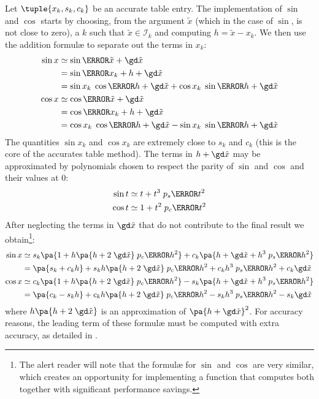\documentclass[10pt, a4paper, twoside]{basestyle}
\newcommand{\red}[1]{\tilde{#1}}
\begin{document}
Let $\tuple{x_k, s_k, c_k}$ be an accurate table entry.  The implementation of $\sin$ and $\cos$ starts by choosing, from the argument $\red x$ (which in the case of $\sin$, is not close to zero), a $k$ such that $\red x \in \mathscr{I}_k$ and computing $h = \red x - x_k$.  We then use the addition formulæ to separate out the terms in $x_k$:
\begin{align*}
\sin x &\simeq \sin\of{\red x + \gd \red x} \\
&= \sin\of{x_k + h + \gd \red x} \\
&= \sin x_k \; \cos\of{h + \gd \red x} + \cos x_k \; \sin\of{h + \gd \red x} \\
\cos x &\simeq \cos\of{\red x + \gd \red x}  \\
&= \cos\of{x_k + h + \gd \red x} \\
&= \cos x_k \; \cos\of{h + \gd \red x} - \sin x_k \; \sin\of{h + \gd \red x}
\end{align*}
The quantities $\sin x_k$ and $\cos x_k$ are extremely close to $s_k$ and $c_k$ (this is the core of the accurates table method).  The terms in $h + \gd \red x$ may be approximated by polynomials chosen to respect the parity of $\sin$ and $\cos$ and their values at $0$:
\begin{align*}
\sin t &\simeq t + t^3 \; p_s\of{t^2} \\
\cos t &\simeq 1 + t^2 \; p_c\of{t^2}
\end{align*}
After neglecting the terms in $\gd \red x$ that do not contribute to the final result we obtain\footnote{The alert reader will note that the formulæ for $\sin$ and $\cos$ are very similar, which creates an opportunity for implementing a function that computes both together with significant performance savings.}:
\begin{align*}
\sin x &\simeq s_k \pa{1 + h \pa{h + 2 \; \gd \red x} \; p_c\of{h^2}} + c_k \pa{h + \gd \red x + h^3 \; p_s\of{h^2}} \\
&= \pa{s_k + c_k h} + s_k h \pa{h + 2 \; \gd \red x} \; p_c\of{h^2} + c_k h^3 \; p_s\of{h^2} + c_k \gd \red x \\
\cos x &\simeq c_k \pa{1 + h \pa{h + 2 \; \gd \red x} \; p_c\of{h^2}} - s_k \pa{h + \gd \red x + h^3 \; p_s\of{h^2}} \\
&= \pa{c_k - s_k h} + c_k h \pa{h + 2 \; \gd \red x} \; p_c\of{h^2} - s_k h^3 \; p_s\of{h^2} - s_k \gd \red x
\end{align*}
where $h \pa{h + 2 \; \gd \red x}$ is an approximation of $\pa{h + \gd \red x}^2$.  For accuracy reasons, the leading term of these formulæ must be computed with extra accuracy, as detailed in .
\end{document}
